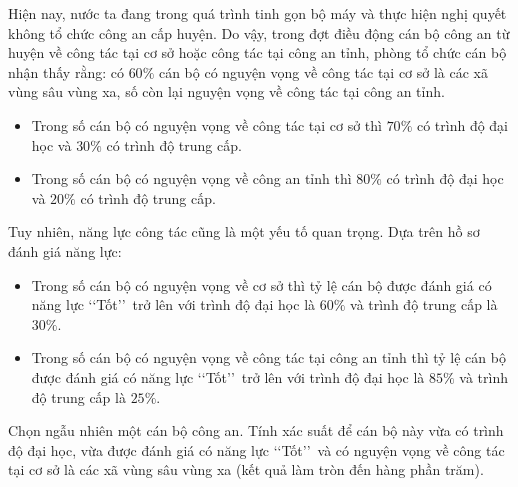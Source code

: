 \documentclass[12pt,a4paper]{article}
\begin{document}
\begin{ex}%
	Hiện nay, nước ta đang trong quá trình tinh gọn bộ máy và thực hiện nghị quyết không tổ chức công an cấp huyện. Do vậy, trong đợt điều động cán bộ công an từ huyện về công tác tại cơ sở hoặc công tác tại công an tỉnh, phòng tổ chức cán bộ nhận thấy rằng: có $60\%$ cán bộ có nguyện vọng về công tác tại cơ sở là các xã vùng sâu vùng xa, số còn lại nguyện vọng về công tác tại công an tỉnh.
	\begin{itemize}
		\item Trong số cán bộ có nguyện vọng về công tác tại cơ sở thì $70\%$ có trình độ đại học và $30\%$ có trình độ trung cấp.
		\item Trong số cán bộ có nguyện vọng về công an tỉnh thì $80\%$ có trình độ đại học và $20\%$ có trình độ trung cấp.
	\end{itemize}
	Tuy nhiên, năng lực công tác cũng là một yếu tố quan trọng. Dựa trên hồ sơ đánh giá năng lực:
	\begin{itemize}
		\item Trong số cán bộ có nguyện vọng về cơ sở thì tỷ lệ cán bộ được đánh giá có năng lực \lq\lq Tốt\rq\rq\, trở lên với trình độ đại học là $60\%$ và trình độ trung cấp là $30\%$.
		\item Trong số cán bộ có nguyện vọng về công tác tại công an tỉnh thì tỷ lệ cán bộ được đánh giá có năng lực \lq\lq Tốt\rq\rq\, trở lên với trình độ đại học là $85\%$ và trình độ trung cấp là $25\%$.
	\end{itemize}
	Chọn ngẫu nhiên một cán bộ công an. Tính xác suất để cán bộ này vừa có trình độ đại học, vừa được đánh giá có năng lực \lq\lq Tốt\rq\rq\, và có nguyện vọng về công tác tại cơ sở là các xã vùng sâu vùng xa (kết quả làm tròn đến hàng phần trăm).
	\par
\end{ex}
\end{document}
